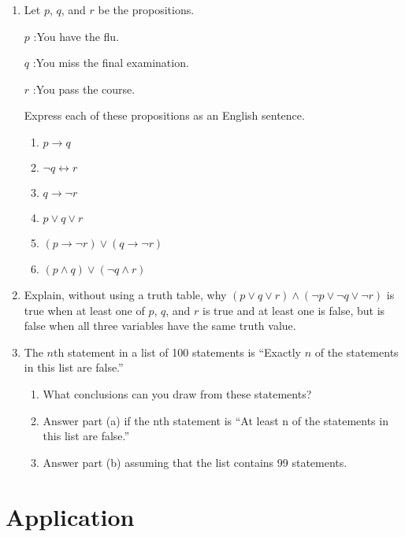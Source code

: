 \documentclass{../../cls/sig-alternate-05-2015}
\begin{document}
\begin{enumerate}
\item Let $p$, $q$, and $r$ be the propositions.

$p$ :You have the flu.

$q$ :You miss the final examination.

$r$ :You pass the course.

Express each of these propositions as an English sentence.

\begin{enumerate}
	\item $p\rightarrow q$
	\item $\neg q \leftrightarrow r$
	\item $q \rightarrow \neg r$
	\item $p \vee q \vee r$
	\item $(p \rightarrow \neg r ) \vee (q \rightarrow \neg r)$
	\item $(p\wedge q)\vee (\neg q \wedge r)$
\end{enumerate}

\item Explain, without using a truth table, why $(p \vee q \vee r) \wedge
(\neg p \vee \neg q \vee \neg r)$ is true when at least one of $p$, $q$, and $r$
is true and at least one is false, but is false when all three
variables have the same truth value.

\item The $n$th statement in a list of 100 statements is \textquotedblleft Exactly
$n$ of the statements in this list are false.\textquotedblright
\begin{enumerate}
	\item What conclusions can you draw from these statements?
	\item Answer part (a) if the nth statement is \textquotedblleft At least n of
	the statements in this list are false.\textquotedblright
	\item Answer part (b) assuming that the list contains 99
	statements.
\end{enumerate}

\end{enumerate}

\section{Application}
\end{document}
